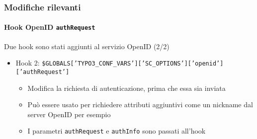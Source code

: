 \begin{frame}[fragile]
	\frametitle{Modifiche rilevanti}
	\framesubtitle{Hook OpenID \texttt{authRequest}}

	\lstset{basicstyle=\tiny\ttfamily}

	Due hook sono stati aggiunti al servizio OpenID (2/2)

		\begin{itemize}

			\item Hook 2:\newline
				\smaller\smaller
					\texttt{\$GLOBALS['TYPO3\_CONF\_VARS']['SC\_OPTIONS']['openid']['authRequest']}
				\normalsize

				\begin{itemize}
					\item Modifica la richiesta di autenticazione, prima che essa sia inviata
					\item Può essere usato per richiedere attributi aggiuntivi come un nickname dal server OpenID per esempio
					\item I parametri \texttt{authRequest} e \texttt{authInfo} sono passati all'hook
				\end{itemize}

		\end{itemize}

\end{frame}

